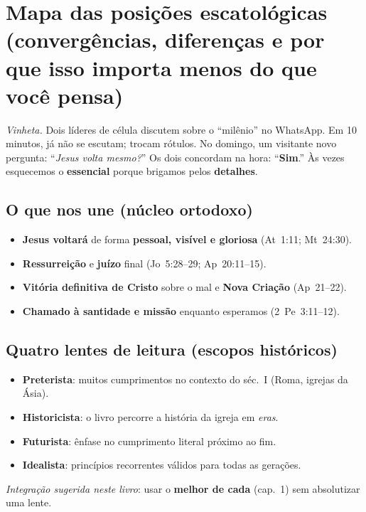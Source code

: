 \chapter{Mapa das posições escatológicas (convergências, diferenças e por que isso importa menos do que você pensa)}
\noindent\textit{Vinheta.} Dois líderes de célula discutem sobre o ``milênio'' no WhatsApp. Em 10 minutos, já não se escutam; trocam rótulos. No domingo, um visitante novo pergunta: ``\emph{Jesus volta mesmo?}'' Os dois concordam na hora: ``\textbf{Sim}.'' Às vezes esquecemos o \textbf{essencial} porque brigamos pelos \textbf{detalhes}.

\section{O que nos une (núcleo ortodoxo)}
\begin{checklist}
\begin{itemize}[leftmargin=*,noitemsep]
  \item \textbf{Jesus voltará} de forma \textbf{pessoal, visível e gloriosa} (At~1:11; Mt~24:30).
  \item \textbf{Ressurreição} e \textbf{juízo} final (Jo~5:28--29; Ap~20:11--15).
  \item \textbf{Vitória definitiva de Cristo} sobre o mal e \textbf{Nova Criação} (Ap~21--22).
  \item \textbf{Chamado à santidade e missão} enquanto esperamos (2~Pe~3:11--12).
\end{itemize}
\end{checklist}

\section{Quatro lentes de leitura (escopos históricos)}
\begin{itemize}[leftmargin=*,noitemsep]
  \item \textbf{Preterista}: muitos cumprimentos no contexto do séc.~I (Roma, igrejas da Ásia).
  \item \textbf{Historicista}: o livro percorre a história da igreja em \emph{eras}.
  \item \textbf{Futurista}: ênfase no cumprimento literal próximo ao fim.
  \item \textbf{Idealista}: princípios recorrentes válidos para todas as gerações.
\end{itemize}
\noindent\textit{Integração sugerida neste livro}: usar o \textbf{melhor de cada} (cap.~1) sem absolutizar uma lente.

